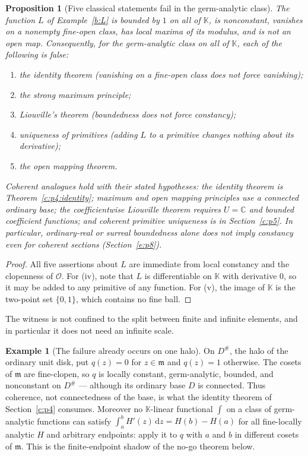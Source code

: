 \documentclass[11pt,a4paper]{article}
\numberwithin{equation}{section}
\newtheorem{proposition}[theorem]{Proposition}
\theoremstyle{definition}
\newtheorem{example}[theorem]{Example}
\theoremstyle{remark}
\theoremstyle{plain}
\newcommand{\K}{\mathbb K}
\newcommand{\CC}{\mathbb C}
\newcommand{\Ov}{\mathcal O}
\newcommand{\mm}{\mathfrak m}
\newcommand{\halo}[1]{#1^{\#}}
\newcommand{\dd}{\mathrm d}
\begin{document}
\begin{proposition}[Five classical statements fail in the germ-analytic class]
\label{b:fivefailures}
The function $L$ of Example~\ref{b:L} is bounded by $1$ on all of $\K$,
is nonconstant, vanishes on a nonempty fine-open class, has local maxima
of its modulus, and is not an open map. Consequently, for the
germ-analytic class \emph{on all of $\K$}, each of the following is false:
\begin{enumerate}[label=\textup{(\roman*)},leftmargin=2.4em]
\item the identity theorem (vanishing on a fine-open class does not force
vanishing);
\item the strong maximum principle;
\item Liouville's theorem (boundedness does not force constancy);
\item uniqueness of primitives (adding $L$ to a primitive changes nothing
about its derivative);
\item the open mapping theorem.
\end{enumerate}
Coherent analogues hold with their stated hypotheses: the identity
theorem is Theorem~\ref{c:p4:identity}; maximum and open mapping
principles use a connected ordinary base; the coefficientwise Liouville
theorem requires $U=\CC$ and bounded coefficient functions; and
coherent primitive uniqueness is in Section~\ref{c:p5}. In particular,
ordinary-real or surreal boundedness alone does not imply constancy
even for coherent sections (Section~\ref{e:p8}).
\end{proposition}

\begin{proof}
All five assertions about $L$ are immediate from local constancy and the
clopenness of $\Ov$. For (iv), note that $L$ is differentiable on $\K$
with derivative $0$, so it may be added to any primitive of any function.
For (v), the image of $\K$ is the two-point set $\{0,1\}$, which contains
no fine ball.
\end{proof}

The witness is not confined to the split between finite and infinite
elements, and in particular it does not need an infinite scale.

\begin{example}[The failure already occurs on one halo]
\label{b:q}
On $\halo{D}$, the halo of the ordinary unit disk, put $q(z)=0$ for
$z\in\mm$ and $q(z)=1$ otherwise. The cosets of $\mm$ are fine-clopen, so
$q$ is locally constant, germ-analytic, bounded, and nonconstant on
$\halo D$ --- although its ordinary base $D$ is connected. Thus coherence,
not connectedness of the base, is what the identity theorem of Section~\ref{c:p4} consumes. Moreover no $\K$-linear functional $\int$ on a
class of germ-analytic functions can satisfy
$\int_a^b H'(z)\,\dd z=H(b)-H(a)$ for all fine-locally analytic $H$ and
arbitrary endpoints: apply it to $q$ with $a$ and $b$ in different cosets
of $\mm$. This is the finite-endpoint shadow of the no-go theorem below.
\end{example}
\end{document}
